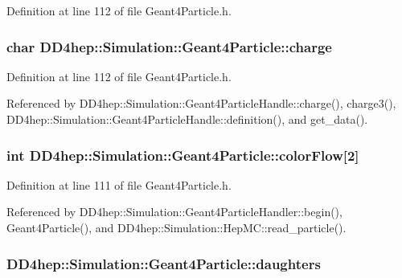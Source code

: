 Definition at line 112 of file Geant4Particle.h.\hypertarget{class_d_d4hep_1_1_simulation_1_1_geant4_particle_a4c8f5bf9cfae6c1089554a86e8a752bc}{
\subsubsection[{charge}]{\setlength{\rightskip}{0pt plus 5cm}char {\bf DD4hep::Simulation::Geant4Particle::charge}}}
\label{class_d_d4hep_1_1_simulation_1_1_geant4_particle_a4c8f5bf9cfae6c1089554a86e8a752bc}


Definition at line 112 of file Geant4Particle.h.

Referenced by DD4hep::Simulation::Geant4ParticleHandle::charge(), charge3(), DD4hep::Simulation::Geant4ParticleHandle::definition(), and get\_\-data().\hypertarget{class_d_d4hep_1_1_simulation_1_1_geant4_particle_a739e02b76f159e26d92023cd1746c8cf}{
\subsubsection[{colorFlow}]{\setlength{\rightskip}{0pt plus 5cm}int {\bf DD4hep::Simulation::Geant4Particle::colorFlow}\mbox{[}2\mbox{]}}}
\label{class_d_d4hep_1_1_simulation_1_1_geant4_particle_a739e02b76f159e26d92023cd1746c8cf}


Definition at line 111 of file Geant4Particle.h.

Referenced by DD4hep::Simulation::Geant4ParticleHandler::begin(), Geant4Particle(), and DD4hep::Simulation::HepMC::read\_\-particle().\hypertarget{class_d_d4hep_1_1_simulation_1_1_geant4_particle_a2d11cd13a703d52fa61142af97e243cb}{
\subsubsection[{daughters}]{ {\bf DD4hep::Simulation::Geant4Particle::daughters}}}
\label{class_d_d4hep_1_1_simulation_1_1_geant4_particle_a2d11cd13a703d52fa61142af97e243cb}



